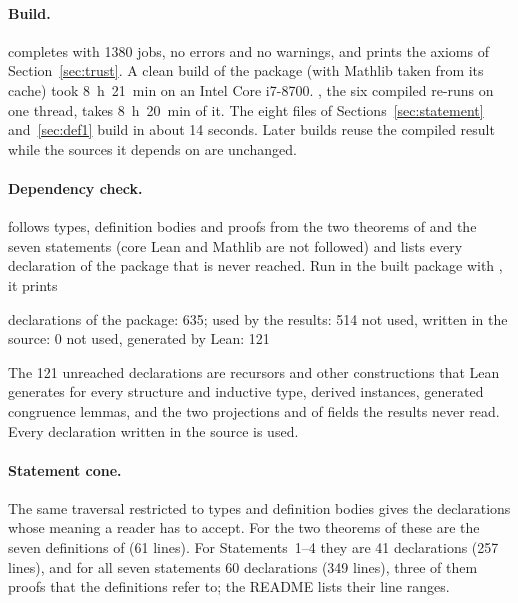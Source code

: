 \paragraph{Build.}  completes with 1380 jobs, no errors and
no warnings, and prints the axioms of Section~\ref{sec:trust}. A clean build
of the package (with Mathlib taken from its cache) took 8~h~21~min on an
Intel Core i7-8700. , the six compiled re-runs on
one thread, takes 8~h~20~min of it. The eight files of
Sections~\ref{sec:statement} and~\ref{sec:def1} build in about 14 seconds.
Later builds reuse the compiled result while the sources it depends on are
unchanged.

\paragraph{Dependency check.}  follows types,
definition bodies and proofs from the two theorems of 
and the seven statements (core Lean and Mathlib are not followed) and lists
every declaration of the package that is never reached. Run in the built
package with , it prints
\begin{code}
declarations of the package: 635; used by the results: 514
not used, written in the source: 0
not used, generated by Lean: 121
\end{code}
The 121 unreached declarations are recursors and other constructions that
Lean generates for every structure and inductive type, derived instances,
generated congruence lemmas, and the two projections  and
 of fields the results never read. Every declaration
written in the source is used.

\paragraph{Statement cone.} The same traversal restricted to types and
definition bodies gives the declarations whose meaning a reader has to
accept. For the two theorems of  these are the seven
definitions of  (61 lines). For Statements~1--4 they
are 41 declarations (257 lines), and for all seven statements 60
declarations (349 lines), three of them proofs that the definitions refer
to; the README lists their line ranges.
